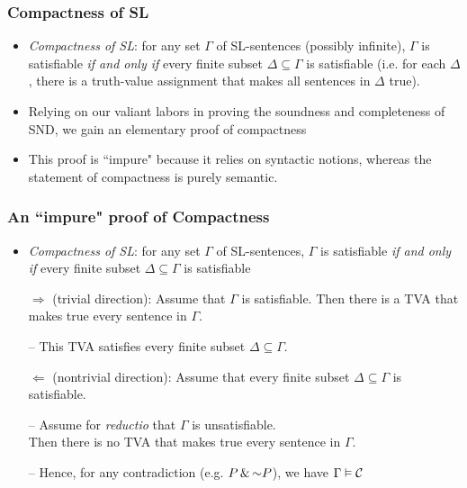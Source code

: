 \begin{frame}
\frametitle{Compactness of SL}

\begin{itemize}[<+->]

\item \emph{Compactness of SL}: for any set $\Gamma$ of SL-sentences (possibly infinite), $\Gamma$ is satisfiable \emph{if and only if} every finite subset $\Delta \subseteq \Gamma$ is satisfiable (i.e. for each $\Delta$, there is a truth-value assignment that makes all sentences in $\Delta$ true). 

\item Relying on our valiant labors in proving the soundness and completeness of SND, we gain an elementary proof of compactness

\item This proof is ``impure" because it relies on syntactic notions, whereas the statement of compactness is purely semantic.

\end{itemize}
\end{frame}

\begin{frame}
\frametitle{An ``impure" proof of Compactness}

\begin{itemize}[<+->]

\item \emph{Compactness of SL}: for any set $\Gamma$ of SL-sentences, $\Gamma$ is satisfiable \emph{if and only if} every finite subset $\Delta \subseteq \Gamma$ is satisfiable

\item[$\Rightarrow$] (trivial direction): Assume that $\Gamma$ is satisfiable. Then there is a TVA that makes true every sentence in $\Gamma$. 
\item[] -- This TVA satisfies every finite subset $\Delta \subseteq \Gamma$.

\item[$\Leftarrow$] (nontrivial direction): Assume that every finite subset $\Delta \subseteq \Gamma$ is satisfiable. 
\item[] -- Assume for \textit{reductio} that $\Gamma$ is unsatisfiable. \\ Then there is no TVA that makes true every sentence in $\Gamma$. 

\item[] -- Hence, for any contradiction  (e.g. $P \eand \enot P$), we have $\Gamma \vDash \mathcal{C}$



\end{itemize}
\end{frame}

